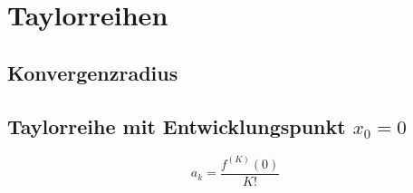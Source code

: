 \section{Taylorreihen}
\subsection{Konvergenzradius}
\subsection{Taylorreihe mit Entwicklungspunkt $x_0 = 0$}
\[ \boxed{a_k = \frac{f^{(K)}(0)}{K!}} \]